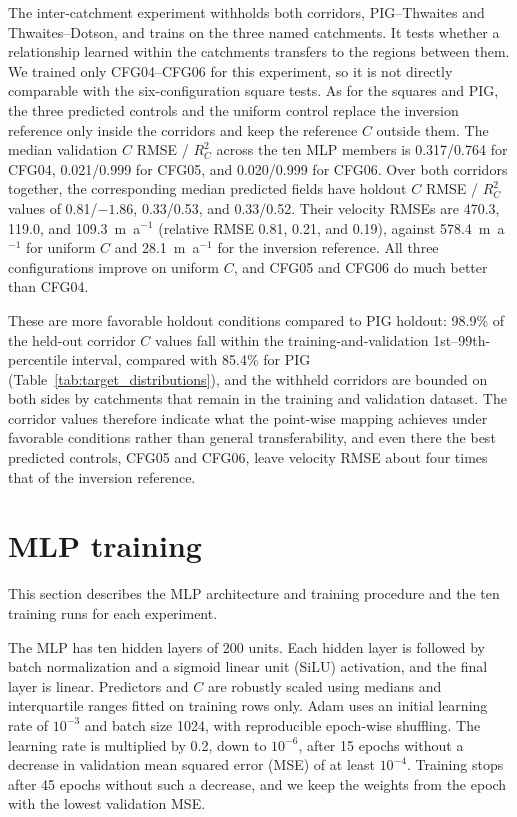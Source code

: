 \documentclass[review,jog]{igs}
\begin{document}
The inter-catchment experiment withholds both corridors, PIG--Thwaites and Thwaites--Dotson, and trains on the three named catchments. It tests whether a relationship learned within the catchments transfers to the regions between them. We trained only CFG04--CFG06 for this experiment, so it is not directly comparable with the six-configuration square tests. As for the squares and PIG, the three predicted controls and the uniform control replace the inversion reference only inside the corridors and keep the reference $C$ outside them. The median validation $C$ RMSE / $R_C^2$ across the ten MLP members is 0.317/0.764 for CFG04, 0.021/0.999 for CFG05, and 0.020/0.999 for CFG06. Over both corridors together, the corresponding median predicted fields have holdout $C$ RMSE / $R_C^2$ values of 0.81/$-1.86$, 0.33/0.53, and 0.33/0.52. Their velocity RMSEs are 470.3, 119.0, and 109.3~m~a$^{-1}$ (relative RMSE 0.81, 0.21, and 0.19), against 578.4~m~a$^{-1}$ for uniform $C$ and 28.1~m~a$^{-1}$ for the inversion reference. All three configurations improve on uniform $C$, and CFG05 and CFG06 do much better than CFG04.

These are more favorable holdout conditions compared to PIG holdout: 98.9\% of the held-out corridor $C$ values fall within the training-and-validation 1st--99th-percentile interval, compared with 85.4\% for PIG (Table~\ref{tab:target_distributions}), and the withheld corridors are bounded on both sides by catchments that remain in the training and validation dataset. The corridor values therefore indicate what the point-wise mapping achieves under favorable conditions rather than general transferability, and even there the best predicted controls, CFG05 and CFG06, leave velocity RMSE about four times that of the inversion reference.


\section{MLP training}
\label{app:training_campaign}

This section describes the MLP architecture and training procedure and the ten training runs for each experiment.

The MLP has ten hidden layers of 200 units. Each hidden layer is followed by batch normalization and a sigmoid linear unit (SiLU) activation, and the final layer is linear. Predictors and $C$ are robustly scaled using medians and interquartile ranges fitted on training rows only. Adam uses an initial learning rate of $10^{-3}$ and batch size 1024, with reproducible epoch-wise shuffling. The learning rate is multiplied by 0.2, down to $10^{-6}$, after 15 epochs without a decrease in validation mean squared error (MSE) of at least $10^{-4}$. Training stops after 45 epochs without such a decrease, and we keep the weights from the epoch with the lowest validation MSE.
\end{document}
